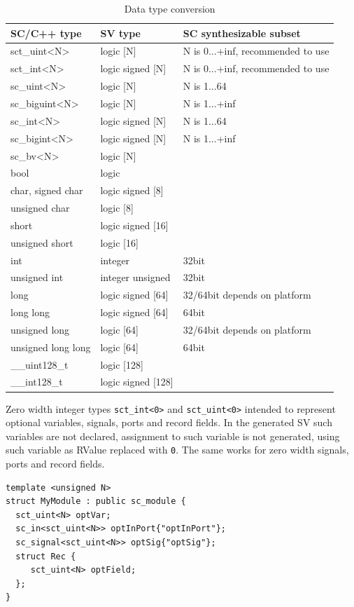 \begin{table}
\begin{tabular}{|l|l|l|}
\hline
SC/C++ type & SV type  & SC synthesizable subset \\
\hline
sct\_uint<N> & logic [N] & N is 0...+inf, recommended to use \\
sct\_int<N> & logic signed [N] & N is 0...+inf, recommended to use \\
sc\_uint<N> & logic [N] & N is 1...64 \\
sc\_biguint<N> & logic [N] & N is 1...+inf \\
sc\_int<N> & logic signed [N] & N is 1...64 \\
sc\_bigint<N> & logic signed [N] & N is 1...+inf \\
sc\_bv<N> & logic [N] & \\
bool & logic & \\
char, signed char & logic signed [8] & \\
unsigned char & logic [8] & \\
short & logic signed [16] & \\
unsigned short & logic [16] & \\
int & integer & 32bit \\
unsigned int & integer unsigned & 32bit \\
long & logic signed [64] & 32/64bit depends on platform \\
long long & logic signed [64] & 64bit \\
unsigned long & logic [64] & 32/64bit depends on platform \\
unsigned long long & logic [64] & 64bit \\
\_\_uint128\_t & logic [128] & \\
\_\_int128\_t & logic signed [128] & \\
\hline
\end{tabular}
\caption{Data type conversion}
\label{tab:data_types}
\end{table}

Zero width integer types {\tt sct\_int<0>} and {\tt sct\_uint<0>} intended to represent optional variables, signals, ports and record fields. In the generated SV such variables are not declared, assignment to such variable is not generated, using such variable as RValue replaced with {\tt 0}. The same works for zero width signals, ports and record fields.

\begin{lstlisting}[style=mycpp]
template <unsigned N>
struct MyModule : public sc_module {
  sct_uint<N> optVar;
  sc_in<sct_uint<N>> optInPort{"optInPort"};
  sc_signal<sct_uint<N>> optSig{"optSig"};
  struct Rec {
     sct_uint<N> optField;     
  };
}
\end{lstlisting}

